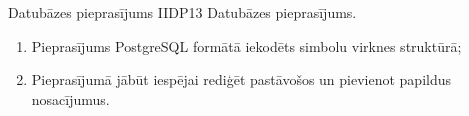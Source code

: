 {Datubāzes pieprasījums}
{IIDP13}
{
	Datubāzes pieprasījums.
}
{
	\begin{enumerate}
		\item Pieprasījums PostgreSQL formātā iekodēts simbolu virknes struktūrā;
		\item Pieprasījumā jābūt iespējai rediģēt pastāvošos un pievienot papildus nosacījumus.
	\end{enumerate}
}
{
}
